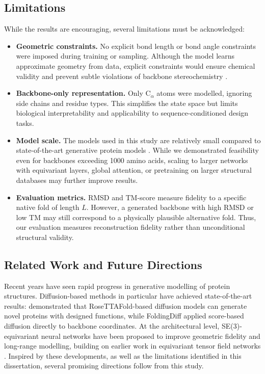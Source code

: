 \documentclass[a4paper,12pt]{article}
\begin{document}
\subsection{Limitations}\label{subsec:limitations}
While the results are encouraging, several limitations must be acknowledged:
\begin{itemize}
    \item \textbf{Geometric constraints.} No explicit bond length or bond angle constraints were imposed during training or sampling. Although the model learns approximate geometry from data, explicit constraints would ensure chemical validity and prevent subtle violations of backbone stereochemistry \citep{branden2012IntroductionProteinStructure,creighton1993proteins,watsonNovoDesignProtein2023}.
    \item \textbf{Backbone-only representation.} Only C\(_\alpha\) atoms were modelled, ignoring side chains and residue types. This simplifies the state space but limits biological interpretability and applicability to sequence-conditioned design tasks.
    \item \textbf{Model scale.} The models used in this study are relatively small compared to state-of-the-art generative protein models \citep{wuProteinStructureGeneration2024,watsonNovoDesignProtein2023}. While we demonstrated feasibility even for backbones exceeding 1000 amino acids, scaling to larger networks with equivariant layers, global attention, or pretraining on larger structural databases may further improve results.
    \item \textbf{Evaluation metrics.} RMSD and TM-score measure fidelity to a specific native fold of length \(L\). However, a generated backbone with high RMSD or low TM may still correspond to a physically plausible alternative fold. Thus, our evaluation measures reconstruction fidelity rather than unconditional structural validity.
\end{itemize}

\subsection{Related Work and Future Directions}\label{subsec:future-work}
Recent years have seen rapid progress in generative modelling of protein structures. Diffusion-based methods in particular have achieved state-of-the-art results: \citet{watsonNovoDesignProtein2023} demonstrated that RoseTTAFold-based diffusion models can generate novel proteins with designed functions, while FoldingDiff \citep{wuProteinStructureGeneration2024} applied score-based diffusion directly to backbone coordinates. At the architectural level, SE(3)-equivariant neural networks \citep{satorras2021EquivariantGraphNeural,geiger2022E3nnEuclideanNeural} have been proposed to improve geometric fidelity and long-range modelling, building on earlier work in equivariant tensor field networks \citep{thomasTensorFieldNetworks2018,weiler3DSteerableCNNs2018,kondorClebschGordanNetsFully2018}. Inspired by these developments, as well as the limitations identified in this dissertation, several promising directions follow from this study.
\end{document}
